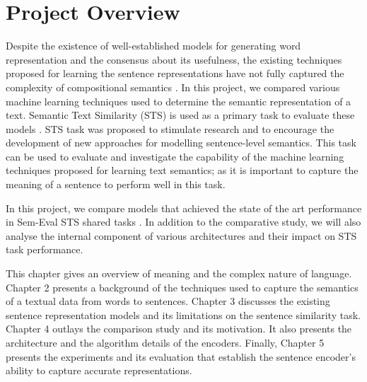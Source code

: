 \documentclass[12pt]{report} %
\begin{document}
	\section{Project Overview}
	Despite the existence of well-established models for generating word representation and the consensus about its usefulness, the existing techniques proposed for learning the sentence representations have not fully captured the complexity of compositional semantics \citep{conneau2017supervised}. In this project, we compared various machine learning techniques used to determine the semantic representation of a text. Semantic Text Similarity (STS) is used as a primary task to evaluate these models  \citep{agirre2012semeval}. STS task was proposed to stimulate research and to encourage the development of new approaches for modelling sentence-level semantics. %
	This task can be used to evaluate and investigate the capability of the machine learning techniques proposed for learning text semantics; as it is important to capture the meaning of a sentence to perform well in this task.
	
	
	In this project, we compare models that achieved the state of the art performance in Sem-Eval STS shared tasks \citep{cer2017semeval}.  In addition to the comparative study, we will also analyse the internal component of various architectures and their impact on STS task performance.
	
	This chapter gives an overview of meaning and the complex nature of language. Chapter 2 presents a background of the techniques used to capture the semantics of a textual data from words to sentences. Chapter 3 discusses the existing sentence representation models and its limitations on the sentence similarity task. Chapter 4  outlays the comparison study and its motivation. It also presents the architecture and the algorithm details of the encoders. Finally, Chapter 5 presents the experiments and its evaluation that establish the sentence encoder's ability to capture accurate representations.
	
\end{document}

